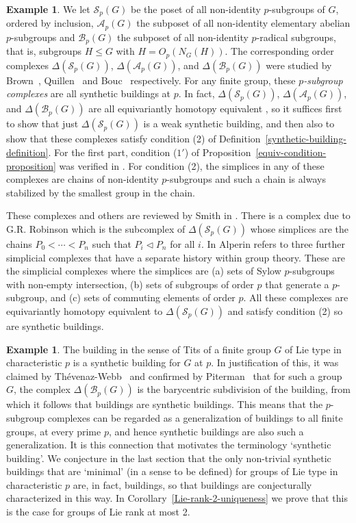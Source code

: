 \documentclass[12pt]{amsart}
\theoremstyle{plain}
\theoremstyle{definition}
\newtheorem{example}[theorem]{Example}
\theoremstyle{remark}
\numberwithin{equation}{section}
\newcommand{\SpCpx}[2]{\Delta(\mathcal{S}_{#2}(#1))}
\newcommand{\ApCpx}[2]{\Delta(\mathcal{A}_{#2}(#1))}
\newcommand{\BpCpx}[2]{\Delta(\mathcal{B}_{#2}(#1))}
\newcommand{\Sp}[2]{\mathcal{S}_{#2}(#1)}
\newcommand{\Ap}[2]{\mathcal{A}_{#2}(#1)}
\newcommand{\Bp}[2]{\mathcal{B}_{#2}(#1)}
\begin{document}
\begin{example}
We let $\Sp{G}{p}$ be the poset of all non-identity $p$-subgroups of $G$, ordered by inclusion, $\Ap{G}{p}$ the subposet of all non-identity elementary abelian $p$-subgroups and $\Bp{G}{p}$ the subposet of all non-identity $p$-radical subgroups, that is, subgroups $H\le G$ with $H=O_p(N_G(H))$. The corresponding order complexes $\SpCpx{G}{p}$, $\ApCpx{G}{p}$, and $\BpCpx{G}{p}$ were studied by Brown~\cite{Bro1975}, Quillen~\cite{Qui1978} and Bouc~\cite{Bou1984} respectively. For any finite group, these \textit{$p$-subgroup complexes} are all synthetic buildings at $p$. In fact, $\SpCpx{G}{p}$, $\ApCpx{G}{p}$, and $\BpCpx{G}{p}$ are all equivariantly homotopy equivalent \cite{The1991}, so it suffices first to show that just $\SpCpx{G}{p}$ is a weak synthetic building, and then also to show that these complexes satisfy condition (2) of Definition~\ref{synthetic-building-definition}. For the first part, condition ($1'$) of Proposition~\ref{equiv-condition-proposition} was verified in \cite[Lemma 2.1.2]{Web1991}. For condition (2), the simplices in any of these complexes are chains of non-identity $p$-subgroups and such a chain is always stabilized by the smallest group in the chain.


These complexes and others are reviewed by Smith in \cite{Smi2011}. There is a complex due to G.R. Robinson which is the subcomplex of $\SpCpx{G}{p}$ whose simplices are the chains $P_0<\cdots<P_n$ such that $P_i\triangleleft P_n$ for all $i$. In \cite{Alp1990} Alperin refers to three further simplicial complexes that have a separate history within group theory. These are the simplicial complexes where the simplices are (a) sets of Sylow $p$-subgroups with non-empty intersection, (b) sets of subgroups of order $p$ that generate a $p$-subgroup, and (c) sets of commuting elements of order $p$. All these complexes are equivariantly homotopy equivalent to $\SpCpx{G}{p}$ and satisfy condition (2) so are synthetic buildings.

\end{example}
\begin{example}
    The building in the sense of Tits of a finite group $G$ of Lie type in characteristic $p$ is a synthetic building for $G$ at $p$. In justification of this, it was claimed by Th\'evenaz-Webb~\cite{The1991} and confirmed by Piterman~\cite{Pit2024} that for such a group $G$, the complex $\BpCpx{G}{p}$ is the barycentric subdivision of the building, from which it follows that buildings are synthetic buildings. This means that the $p$-subgroup complexes can be regarded as a generalization of buildings to all finite groups, at every prime $p$, and hence synthetic buildings are also such a generalization.   It is this connection that motivates the terminology `synthetic building'. We conjecture in the last section that the only non-trivial synthetic buildings that are `minimal'  (in a sense to be defined) for groups of Lie type in characteristic $p$ are, in fact, buildings, so that buildings are conjecturally characterized in this way. In Corollary~\ref{Lie-rank-2-uniqueness} we prove that this is the case for groups of Lie rank at most 2. 
\end{example}
\end{document}
